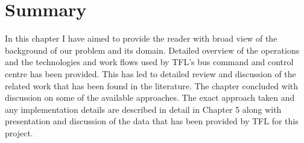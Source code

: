 
\section{Summary}
In this chapter I have aimed to provide the reader with broad view of the background of our problem and its domain. Detailed overview of the operations and the technologies and work flows used by TFL's bus command and control centre has been provided. This has led to detailed review and discussion of the related work that has been found in the literature. The chapter concluded with discussion on some of the available approaches. The exact approach taken and any implementation details are described in detail in Chapter 5 along with presentation and discussion of the data that has been provided by TFL for this project.